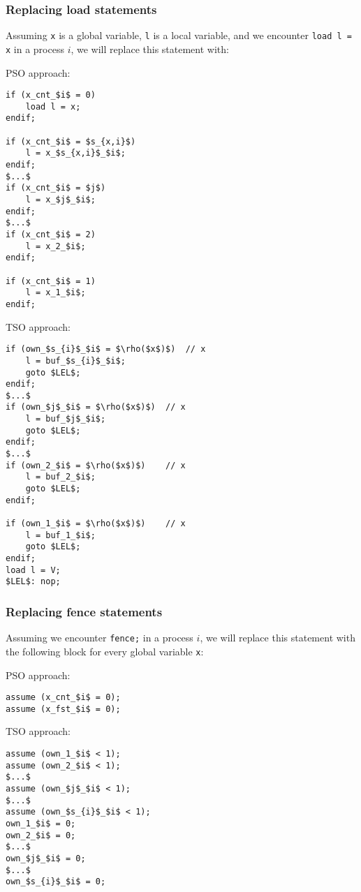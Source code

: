 \pagebreak

\subsubsection{Replacing load statements}

Assuming \lstinline$x$ is a global variable, \lstinline$l$ is a local variable, and we encounter \lstinline$load l = x$ in a process $i$, we will replace this statement with:

\begin{multicols}{2}

PSO approach:

\begin{lstlisting}[frame=single, mathescape]
if (x_cnt_$i$ = 0)
	load l = x;
endif;

if (x_cnt_$i$ = $s_{x,i}$)
	l = x_$s_{x,i}$_$i$;
endif;
$...$
if (x_cnt_$i$ = $j$)
	l = x_$j$_$i$;
endif;
$...$
if (x_cnt_$i$ = 2)
	l = x_2_$i$;
endif;

if (x_cnt_$i$ = 1)
	l = x_1_$i$;
endif;
\end{lstlisting}

\columnbreak

TSO approach:

\begin{lstlisting}[frame=single, mathescape]
if (own_$s_{i}$_$i$ = $\rho($x$)$)	// x
    l = buf_$s_{i}$_$i$;
    goto $LEL$;
endif;
$...$
if (own_$j$_$i$ = $\rho($x$)$)	// x
    l = buf_$j$_$i$;
    goto $LEL$;
endif;
$...$
if (own_2_$i$ = $\rho($x$)$)	// x
    l = buf_2_$i$;
    goto $LEL$;
endif;

if (own_1_$i$ = $\rho($x$)$)	// x
    l = buf_1_$i$;
    goto $LEL$;
endif;
load l = V;
$LEL$: nop;
\end{lstlisting}

\end{multicols}

\subsubsection{Replacing fence statements}

Assuming we encounter \lstinline$fence;$ in a process $i$, we will replace this statement with the following block for every global variable \lstinline$x$:

\begin{multicols}{2}

PSO approach:

\begin{lstlisting}[frame=single, mathescape]
assume (x_cnt_$i$ = 0);
assume (x_fst_$i$ = 0);
\end{lstlisting}

\columnbreak

TSO approach:

\begin{lstlisting}[frame=single, mathescape]
assume (own_1_$i$ < 1);
assume (own_2_$i$ < 1);
$...$
assume (own_$j$_$i$ < 1);
$...$
assume (own_$s_{i}$_$i$ < 1);
own_1_$i$ = 0;
own_2_$i$ = 0;
$...$
own_$j$_$i$ = 0;
$...$
own_$s_{i}$_$i$ = 0;
\end{lstlisting}

\end{multicols}

